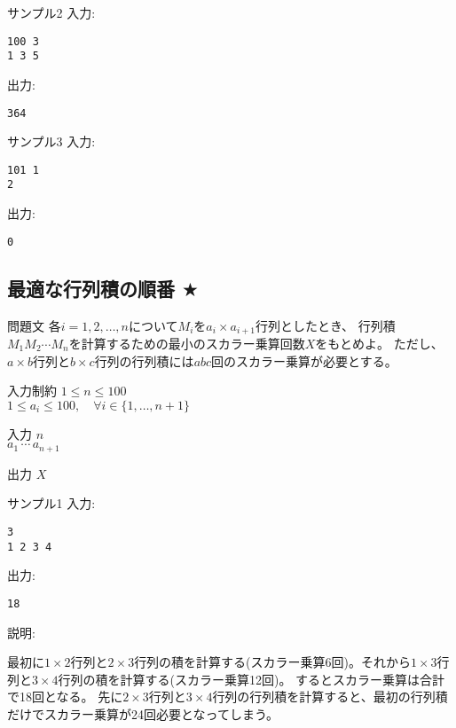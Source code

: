 \documentclass[a4paper,twoside,onecolumn,openany,article,10pt]{memoir}
\theoremstyle{remark}
\begin{document}
\begin{itembox}[l]{サンプル2}
入力:
\begin{verbatim}
100 3
1 3 5
\end{verbatim}
出力:
\begin{verbatim}
364
\end{verbatim}
\end{itembox}

\begin{itembox}[l]{サンプル3}
入力:
\begin{verbatim}
101 1
2
\end{verbatim}
出力:
\begin{verbatim}
0
\end{verbatim}
\end{itembox}
\fi

\subsection{最適な行列積の順番 $\bigstar$}
\begin{itembox}[l]{問題文}
各$i=1,2,\dotsc,n$について$M_i$を$a_i\times a_{i+1}$行列としたとき、
行列積$M_1M_2\dotsm M_{n}$を計算するための最小のスカラー乗算回数$X$をもとめよ。
ただし、$a\times b$行列と$b\times c$行列の行列積には$abc$回のスカラー乗算が必要とする。
\end{itembox}

\begin{itembox}[l]{入力制約}
$1\le n\le 100$\\
$1\le a_i\le 100,\quad\forall i\in\{1,\dotsc,n+1\}$
\end{itembox}

\begin{itembox}[l]{入力}
$n$\\
$a_1\, \cdots\, a_{n+1}$
\end{itembox}

\begin{itembox}[l]{出力}
$X$
\end{itembox}

\begin{itembox}[l]{サンプル1}
入力:
\begin{verbatim}
3
1 2 3 4
\end{verbatim}
出力:
\begin{verbatim}
18
\end{verbatim}
説明:

\vspace{.5em}
最初に$1\times 2$行列と$2\times 3$行列の積を計算する(スカラー乗算6回)。それから$1\times 3$行列と$3\times 4$行列の積を計算する(スカラー乗算12回)。
するとスカラー乗算は合計で18回となる。
先に$2\times 3$行列と$3\times 4$行列の行列積を計算すると、最初の行列積だけでスカラー乗算が24回必要となってしまう。
\end{itembox}
\end{document}
